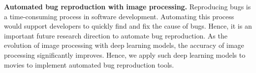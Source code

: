 \noindent
\textbf{Automated bug reproduction with image processing.}
Reproducing bugs is a time-consuming process 
in software development.
Automating this process would support developers 
to quickly find and fix the cause of bugs. 
Hence, it is an important future research direction 
to automate bug reproduction. 
As the evolution of image processing with deep learning models, 
the accuracy of image processing significantly improves. 
Hence, we apply such deep learning models to movies 
to implement automated bug reproduction tools. 